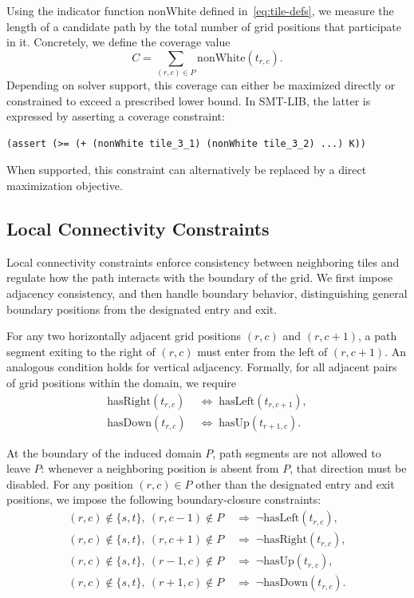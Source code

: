 \documentclass[letterpaper,11pt]{article}
\begin{document}
Using the indicator function \(\mathrm{nonWhite}\) defined
in~\eqref{eq:tile-defs}, we measure the length of a candidate path by
the total number of grid positions that participate in it. Concretely,
we define the coverage value
\begin{equation}
\label{eq:coverage}
C = \sum_{(r,c)\in P} \mathrm{nonWhite}(t_{r,c}).
\end{equation}
Depending on solver support, this coverage can either be maximized
directly or constrained to exceed a prescribed lower bound. In
SMT-LIB, the latter is expressed by asserting a coverage constraint:
\begin{tcolorbox}[smtsimple]
\begin{verbatim}
(assert (>= (+ (nonWhite tile_3_1) (nonWhite tile_3_2) ...) K))
\end{verbatim}
\end{tcolorbox}
When supported, this constraint can alternatively be replaced by a
direct maximization objective.

\subsection*{Local Connectivity Constraints}
Local connectivity constraints enforce consistency between neighboring
tiles and regulate how the path interacts with the boundary of the
grid. We first impose adjacency consistency, and then handle boundary
behavior, distinguishing general boundary positions from the
designated entry and exit.

For any two horizontally adjacent grid positions \((r,c)\) and
\((r,c+1)\), a path segment exiting to the right of \((r,c)\) must
enter from the left of \((r,c+1)\). An analogous condition holds for
vertical adjacency. Formally, for all adjacent pairs of grid positions
within the domain, we require
\[
\begin{aligned}
\mathrm{hasRight}(t_{r,c}) &\;\Longleftrightarrow\;
\mathrm{hasLeft}(t_{r,c+1}), \\
\mathrm{hasDown}(t_{r,c}) &\;\Longleftrightarrow\;
\mathrm{hasUp}(t_{r+1,c}).
\end{aligned}
\]

At the boundary of the induced domain \(P\), path segments are not
allowed to leave \(P\): whenever a neighboring position is absent from
\(P\), that direction must be disabled. For any position \((r,c)\in
P\) other than the designated entry and exit positions, we impose the
following boundary-closure constraints:
\[
\begin{aligned}
(r,c)\notin\{s,t\},\ (r,c-1)\notin P
&\;\Rightarrow\; \neg \mathrm{hasLeft}(t_{r,c}), \\
(r,c)\notin\{s,t\},\ (r,c+1)\notin P
&\;\Rightarrow\; \neg \mathrm{hasRight}(t_{r,c}), \\
(r,c)\notin\{s,t\},\ (r-1,c)\notin P
&\;\Rightarrow\; \neg \mathrm{hasUp}(t_{r,c}), \\
(r,c)\notin\{s,t\},\ (r+1,c)\notin P
&\;\Rightarrow\; \neg \mathrm{hasDown}(t_{r,c}).
\end{aligned}
\]
\end{document}
